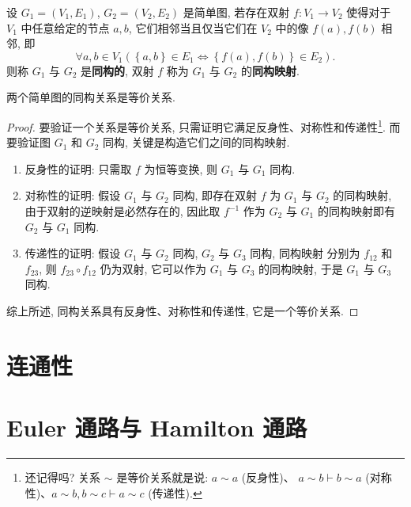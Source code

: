 \documentclass[10pt,UTF8]{book} %
\begin{document}
\begin{definition}
    设 $G_1 = (V_1, E_1)$, $G_2 = (V_2, E_2)$ 是简单图, 若存在双射 $f: V_1 \to V_2$
    使得{\kaishu 对于 $V_1$ 中任意给定的节点 $a,b$, 它们相邻当且仅当它们在 $V_2$ 中的像
    $f(a), f(b)$ 相邻}, 即
    \[ \forall a,b \in V_1 \left( \left\{ a,b \right\} \in E_1 
    \iff \left\{ f(a), f(b) \right\} \in E_2 \right). \]
    则称 $G_1$ 与 $G_2$ 是\textbf{同构的}, 双射 $f$ 称为 $G_1$ 与 $G_2$ 
    的\textbf{同构映射}.
\end{definition}
\setcounter{property}{0}
\begin{property}
    两个简单图的同构关系是等价关系.
    \begin{proof}
        要验证一个关系是等价关系, 只需证明它满足反身性、对称性和传递性\footnote{
            还记得吗? 关系 $\sim$ 是等价关系就是说: $a \sim a$ (反身性)、
            $a \sim b \vdash b \sim a$ (对称性)、$a \sim b, b \sim c \vdash 
            a \sim c$ (传递性).
        }. 而要验证图 $G_1$ 和 $G_2$
        同构, 关键是构造它们之间的同构映射.
        \begin{enumerate}[label={$\left.\mathrm{\alph*}\right)$}, itemsep=0pt]
            \item 反身性的证明: 只需取 $f$ 为恒等变换, 则 $G_1$ 与 $G_1$ 同构.
            \item 对称性的证明: 假设 $G_1$ 与 $G_2$ 同构, 即存在双射 $f$ 为 $G_1$ 与
            $G_2$ 的同构映射, 由于双射的逆映射是必然存在的, 因此取 $f^{-1}$ 作为 $G_2$
            与 $G_1$ 的同构映射即有 $G_2$ 与 $G_1$ 同构.
            \item 传递性的证明: 假设 $G_1$ 与 $G_2$ 同构, $G_2$ 与 $G_3$ 同构, 同构映射
            分别为 $f_{12}$ 和 $f_{23}$, 则 $f_{23} \circ f_{12}$ 仍为双射, 它可以作为
            $G_1$ 与 $G_3$ 的同构映射, 于是 $G_1$ 与 $G_3$ 同构.
        \end{enumerate}
        综上所述, 同构关系具有反身性、对称性和传递性, 它是一个等价关系.
    \end{proof}
\end{property}

\newpage
\section{连通性}



\newpage
\section{Euler 通路与 Hamilton 通路}
\end{document}
